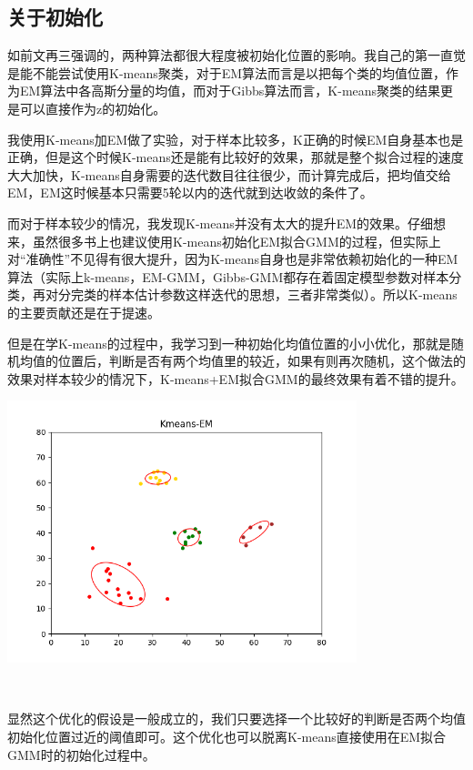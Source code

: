\documentclass[hyperref,UTF8]{ctexart}
\begin{document}
\subsection*{关于初始化}
\par 如前文再三强调的，两种算法都很大程度被初始化位置的影响。我自己的第一直觉是能不能尝试使用K-means聚类，对于EM算法而言是以把每个类的均值位置，作为EM算法中各高斯分量的均值，而对于Gibbs算法而言，K-means聚类的结果更是可以直接作为z的初始化。
\par 我使用K-means加EM做了实验，对于样本比较多，K正确的时候EM自身基本也是正确，但是这个时候K-means还是能有比较好的效果，那就是整个拟合过程的速度大大加快，K-means自身需要的迭代数目往往很少，而计算完成后，把均值交给EM，EM这时候基本只需要5轮以内的迭代就到达收敛的条件了。
\par 而对于样本较少的情况，我发现K-means并没有太大的提升EM的效果。仔细想来，虽然很多书上也建议使用K-means初始化EM拟合GMM的过程，但实际上对“准确性”不见得有很大提升，因为K-means自身也是非常依赖初始化的一种EM算法（实际上k-means，EM-GMM，Gibbs-GMM都存在着固定模型参数对样本分类，再对分完类的样本估计参数这样迭代的思想，三者非常类似）。所以K-means的主要贡献还是在于提速。
\par 但是在学K-means的过程中，我学习到一种初始化均值位置的小小优化，那就是随机均值的位置后，判断是否有两个均值里的较近，如果有则再次随机，这个做法的效果对样本较少的情况下，K-means+EM拟合GMM的最终效果有着不错的提升。\\
\centerline{\includegraphics[height=3in]{exp-results/Kmeans-EM-40.png}}\\
\par 显然这个优化的假设是一般成立的，我们只要选择一个比较好的判断是否两个均值初始化位置过近的阈值即可。这个优化也可以脱离K-means直接使用在EM拟合GMM时的初始化过程中。
\end{document}
